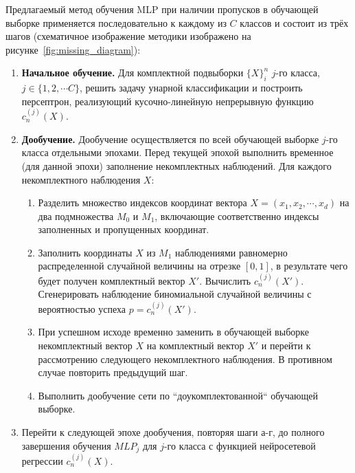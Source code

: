 Предлагаемый метод обучения MLP при наличии пропусков в обучающей выборке применяется последовательно к каждому из \(C\) классов и состоит из трёх шагов (схематичное изображение методики изображено на рисунке~\cref{fig:missing_diagram}):

\begin{enumerate}

    \item \textbf{Начальное обучение.} Для комплектной подвыборки \(\{X\}_i^n\) \(j\)-го класса, \(j \in \{1, 2, \cdots C\}\), решить задачу унарной классификации и построить персептрон, реализующий кусочно-линейную непрерывную функцию \(c_n^{(j)}(X)\).
    
    \item \textbf{Дообучение.} Дообучение  осуществляется по всей обучающей выборке \(j\)-го класса отдельными эпохами. Перед текущей эпохой выполнить временное (для данной эпохи) заполнение некомплектных наблюдений. Для каждого некомплектного наблюдения \(X\):

    \begin{enumerate}
        \item Разделить множество индексов координат вектора \(X=(x_1, x_2, \cdots, x_d)\) на два подмножества \(M_0\) и \(M_1\), включающие соответственно индексы заполненных и пропущенных координат. 
        
        \item Заполнить координаты \(X\) из \(M_1\) наблюдениями равномерно распределенной случайной величины на отрезке \([0, 1]\), в результате чего будет получен комплектный вектор \(X'\). Вычислить \(c_n^{(j)}(X')\). Сгенерировать наблюдение биномиальной случайной величины с вероятностью успеха \(p=c_n^{(j)}(X')\).
        
        \item При успешном исходе временно заменить в обучающей выборке некомплектный вектор \(X\) на комплектный вектор \(X'\) и перейти к рассмотрению следующего некомплектного наблюдения. В противном случае повторить предыдущий шаг.
        
        \item Выполнить дообучение сети по ``доукомплектованной`` обучающей выборке.
    \end{enumerate}
    
    \item Перейти к следующей эпохе дообучения, повторяя шаги а-г, до полного завершения обучения \(MLP_j\) для \(j\)-го класса с функцией нейросетевой регрессии \(c_n^{(j)}(X)\).
\end{enumerate}

